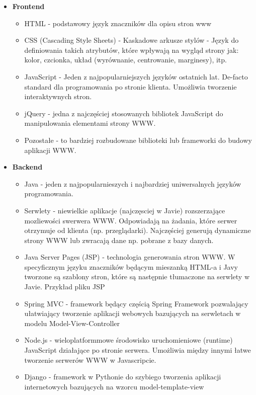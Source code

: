 \documentclass[../main.tex]{subfiles}
\begin{document}
    \begin{itemize}
        \item \textbf{Frontend}
        \begin{itemize}
            \item HTML - podstawowy język znaczników dla opisu stron www
            \item CSS (Cascading Style Sheets) - Kaskadowe arkusze stylów - Język do definiowania takich atrybutów, które wpływają na wygląd strony jak: kolor, czcionka, układ (wyrównanie, centrowanie, marginesy), itp.
            \item JavaScript - Jeden z najpopularniejszych języków ostatnich lat. De-facto standard dla programowania po stronie klienta. Umożliwia tworzenie interaktywnych stron.
            \item jQuery - jedna z najczęściej stosowanych bibliotek JavaScript do manipulowania elementami strony WWW.
            \item Pozostałe - to bardziej rozbudowane biblioteki lub frameworki do budowy aplikacji WWW.
        \end{itemize}
        \item \textbf{Backend}
        \begin{itemize}
            \item Java - jeden z najpopularnieszych i najbardziej uniwersalnych języków programowania.
            \item Serwlety - niewielkie aplikacje (najczęsciej w Javie) rozszerzające mozliewości swerwera WWW. Odpowiadają na żadania, które serwer otrzymuje od klienta (np. przeglądarki). Najczęściej generują dynamiczne strony WWW lub zwracają dane np. pobrane z bazy danych.
            \item Java Server Pages (JSP) - technologia generowania stron WWW. W specyficznym języku znaczników będącym mieszanką HTML-a i Javy tworzone są szablony stron, które są następnie tłumaczone na serwlety w Javie. Przykład pliku JSP
            \item Spring MVC - framework będący częścią Spring Framework pozwalający ułatwiający tworzenie aplikacji webowych bazujących na serwletach w modelu Model-View-Controller
            \item Node.js - wieloplatformmowe środowisko uruchomieniowe (runtime) JavaScript działające po stronie serwera. Umożliwia między innymi łatwe tworzenie serwerów WWW w Javascripcie.
            \item Django - framework w Pythonie do szybiego tworzenia aplikacji internetowych bazujących na wzorcu model-template-view

\end{itemize}
\end{itemize}
\end{document}

